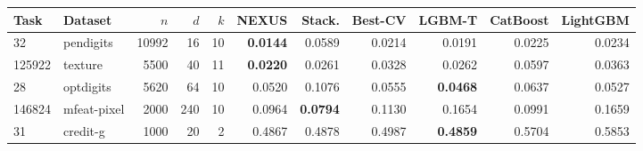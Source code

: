 \begin{longtable}{llrrrrrrrrr}
\toprule
Task & Dataset & $n$ & $d$ & $k$ & NEXUS & Stack. & Best-CV & LGBM-T & CatBoost & LightGBM\\
\midrule
\endhead
32 & pendigits & 10992 & 16 & 10 & \textbf{0.0144} & 0.0589 & 0.0214 & 0.0191 & 0.0225 & 0.0234\\
125922 & texture & 5500 & 40 & 11 & \textbf{0.0220} & 0.0261 & 0.0328 & 0.0262 & 0.0597 & 0.0363\\
28 & optdigits & 5620 & 64 & 10 & 0.0520 & 0.1076 & 0.0555 & \textbf{0.0468} & 0.0637 & 0.0527\\
146824 & mfeat-pixel & 2000 & 240 & 10 & 0.0964 & \textbf{0.0794} & 0.1130 & 0.1654 & 0.0991 & 0.1659\\
31 & credit-g & 1000 & 20 & 2 & 0.4867 & 0.4878 & 0.4987 & \textbf{0.4859} & 0.5704 & 0.5853\\
\bottomrule
\end{longtable}
